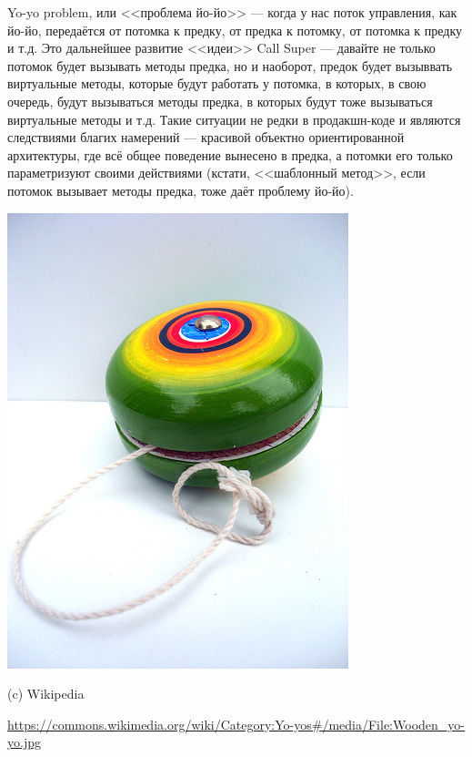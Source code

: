 \documentclass{../text-style}
\begin{document}
\noindent\begin{minipage}{\textwidth}
    \begin{minipage}[c][6cm][c]{\dimexpr0.7\textwidth-0.5\Colsep\relax}
        Yo-yo problem, или <<проблема йо-йо>> --- когда у нас поток управления, как йо-йо, передаётся от потомка к предку, от предка к потомку, от потомка к предку и т.д. Это дальнейшее развитие <<идеи>> Call Super --- давайте не только потомок будет вызывать методы предка, но и наоборот, предок будет вызыввать виртуальные методы, которые будут работать у потомка, в которых, в свою очередь, будут вызываться методы предка, в которых будут тоже вызываться виртуальные методы и т.д. Такие ситуации не редки в продакшн-коде и являются следствиями благих намерений --- красивой объектно ориентированной архитектуры, где всё общее поведение вынесено в предка, а потомки его только параметризуют своими действиями (кстати, <<шаблонный метод>>, если потомок вызывает методы предка, тоже даёт проблему йо-йо).
    \end{minipage}\hfill
    \begin{minipage}[c][6cm][c]{\dimexpr0.3\textwidth-0.5\Colsep\relax}
        \includegraphics[width=\textwidth]{yo-yo.jpg}

        \footnotesize{(c) Wikipedia}

        \tiny{\url{https://commons.wikimedia.org/wiki/Category:Yo-yos\#/media/File:Wooden\_yo-yo.jpg}}
    \end{minipage}%
\end{minipage}
\end{document}

